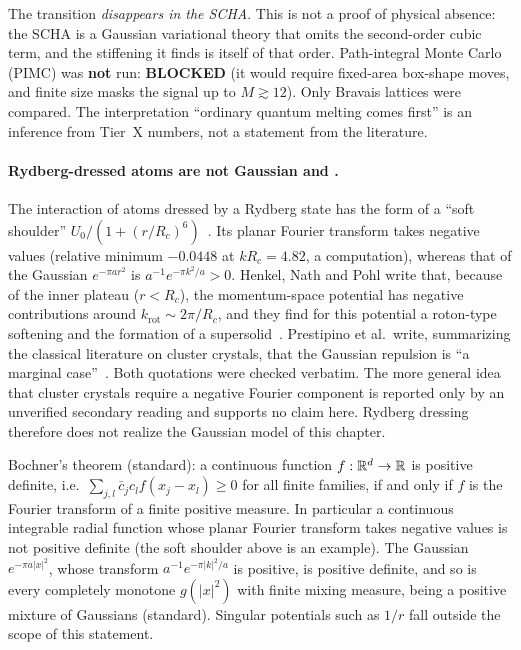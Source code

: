 \begin{warnbox}
The transition \emph{disappears in the SCHA}. This is not a proof of physical absence: the SCHA is a Gaussian
variational theory that omits the second-order cubic term, and the stiffening it finds is itself of that
order. Path-integral Monte Carlo (PIMC) was \textbf{not} run: \textbf{BLOCKED} (it would require fixed-area box-shape
moves, and finite size masks the signal up to $M\gtrsim12$). Only Bravais lattices were compared. The
interpretation ``ordinary quantum melting comes first'' is an inference from Tier~X numbers, not a statement from the
literature.
\end{warnbox}

\paragraph{Rydberg-dressed atoms are not Gaussian \tierC{} and \tierX.} The interaction of atoms dressed by
a Rydberg state has the form of a ``soft shoulder'' $U_0/(1+(r/R_c)^6)$~\cite{ch3-zeiher,ch3-henkel}. Its planar
Fourier transform takes negative values (relative minimum $-0.0448$ at $kR_c=4.82$, a \tierX{} computation), whereas
that of the Gaussian $e^{-\pi ar^2}$ is $a^{-1}e^{-\pi k^2/a}>0$. Henkel, Nath and Pohl write that, because of the inner
plateau ($r<R_c$), the momentum-space potential has negative contributions around $k_{\mathrm{rot}}\sim2\pi/R_c$, and
they find for this potential a roton-type softening and the formation of a supersolid~\cite{ch3-henkel}.
Prestipino et al.\ write, summarizing the classical literature on cluster crystals, that the Gaussian repulsion is ``a
marginal case''~\cite{ch3-prestipino}. Both quotations were checked verbatim. The more general idea that cluster
crystals require a negative Fourier component is reported only by an unverified secondary reading
and supports no claim here. Rydberg dressing therefore does not realize the Gaussian model of this chapter.

\begin{uniremark}\tierL{} Bochner's theorem (standard): a continuous function $f:\mathbb{R}^d\to\mathbb{R}$ is positive definite, i.e.\
$\sum_{j,l}\bar c_jc_lf(x_j-x_l)\ge0$ for all finite families, if and only if $f$ is the Fourier transform of a finite
positive measure. In particular a continuous integrable radial function whose planar Fourier transform takes negative values is not
positive definite (the soft shoulder above is an example). The Gaussian $e^{-\pi a|x|^2}$, whose transform
$a^{-1}e^{-\pi|k|^2/a}$ is positive, is positive definite, and so is every completely monotone $g(|x|^2)$ with finite
mixing measure, being a positive mixture of Gaussians (standard). Singular potentials such as $1/r$ fall outside
the scope of this statement.
\end{uniremark}

